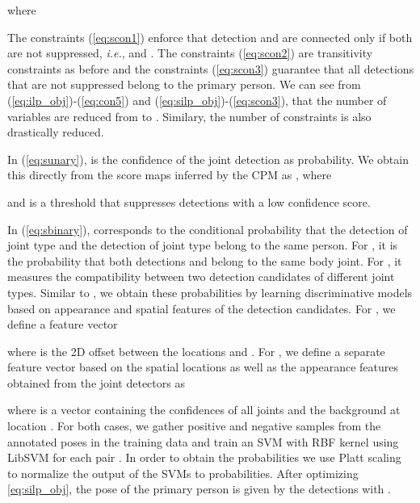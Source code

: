 \documentclass[runningheads]{llncs}
\newcommand{\ie}{\mbox{\emph{i.e.}}}
\begin{document}
where 

The constraints (\ref{eq:scon1}) enforce that detection  and  are connected  only if both are not suppressed, \ie,  and . The constraints (\ref{eq:scon2}) are transitivity constraints as before and the constraints (\ref{eq:scon3}) guarantee that all detections that are not suppressed belong to the primary person. We can see from (\ref{eq:ilp_obj})-(\ref{eq:con5}) and (\ref{eq:silp_obj})-(\ref{eq:scon3}), that the number of variables are reduced from  to . Similary, the number of constraints is also drastically reduced.  

In (\ref{eq:sunary}),  is the confidence of the joint detection  as probability. We obtain this directly from the score maps inferred by the CPM as , where 
			

and  is a threshold that suppresses detections with a low confidence score. 

In (\ref{eq:sbinary}),  corresponds to the conditional probability that the detection  of joint type  and the detection  of joint type  belong to the same person. For , it is the probability that both detections  and  belong to the same body joint. For , it measures the compatibility between two detection candidates of different joint types. Similar to \cite{pishchulin2015deepcut}, we obtain these probabilities by learning discriminative models based on appearance and spatial features of the detection candidates. For , we define a feature vector 
  
where  is the 2D offset between the locations  and .
For , we define a separate feature vector based on the spatial locations as well as the appearance features obtained from the joint detectors as 
 
where  is a vector containing the confidences of all joints and the background at location .  
For both cases, we gather positive and negative samples from the annotated poses in the training data and train an SVM with RBF kernel using LibSVM \cite{libsvm} for each pair . In order to obtain the probabilities  we use Platt scaling \cite{Platt99probabilisticoutputs} to normalize the output of the SVMs to probabilities. After optimizing \eqref{eq:silp_obj}, the pose of the primary person is given by the detections with . 
\end{document}
